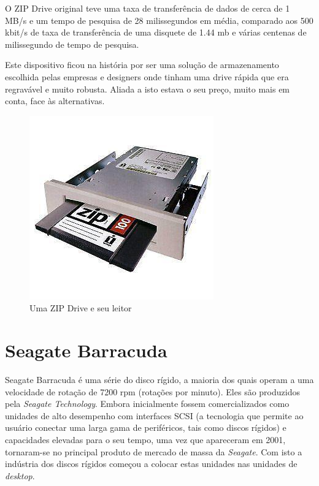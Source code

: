 \documentclass{report}
\begin{document}
	O ZIP Drive original teve uma taxa de transferência de dados de cerca de 1 MB/s e um tempo de pesquisa de 28 milissegundos em média, comparado aos 500 kbit/s de taxa de transferência de uma disquete de 1.44 \ac{mb} e várias centenas de milissegundo de tempo de pesquisa.
\vspace{1mm}

	Este dispositivo ficou na história por ser uma solução de armazenamento escolhida pelas empresas e designers onde tinham uma drive rápida que era regravável e muito robusta. Aliada a isto estava o seu preço, muito mais em conta, face às alternativas.
\vspace{1mm}
	
	\begin{figure} [h]
		\centering
		\includegraphics[scale=0.5]{zipdrive.jpg}
		\caption{Uma ZIP Drive e seu leitor}
	\end{figure}
	
\newpage

	\section{Seagate Barracuda}

	Seagate Barracuda é uma série do disco rígido, a maioria dos quais operam a uma velocidade de rotação de 7200 rpm (rotações por minuto). Eles são produzidos pela \textit{Seagate Technology}. Embora inicialmente fossem comercializados como unidades de alto desempenho com interfaces SCSI (a tecnologia que permite ao usuário conectar uma larga gama de periféricos, tais como discos rígidos) e capacidades elevadas para o seu tempo, uma vez que apareceram em 2001, tornaram-se no principal produto de mercado de massa da \textit{Seagate}. Com isto a indústria dos discos rígidos começou a colocar estas unidades nas unidades de \textit{desktop}.
\vspace{1mm}
\end{document}
